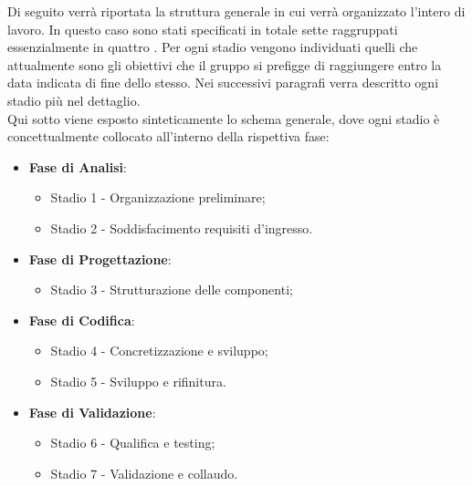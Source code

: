 Di seguito verrà riportata la struttura generale in cui verrà organizzato l'intero  di lavoro. In questo caso sono stati specificati in totale sette  raggruppati essenzialmente in quattro . Per ogni stadio vengono individuati quelli che attualmente sono gli obiettivi che il gruppo \Gruppo{} si prefigge di raggiungere entro la data indicata di fine dello stesso. Nei successivi paragrafi verra descritto ogni stadio più nel dettaglio.\\
Qui sotto viene esposto sinteticamente lo schema generale, dove ogni stadio è concettualmente collocato all'interno della rispettiva fase:

\begin{itemize}
    \item \textbf{Fase di Analisi}:
    \begin{itemize}
        \item Stadio 1 - Organizzazione preliminare;
        \item Stadio 2 - Soddisfacimento requisiti d'ingresso.
    \end{itemize}

    \item \textbf{Fase di Progettazione}:
    \begin{itemize}
        \item Stadio 3 - Strutturazione delle componenti;
    \end{itemize}

    \item \textbf{Fase di Codifica}:
    \begin{itemize}
        \item Stadio 4 - Concretizzazione e sviluppo;
        \item Stadio 5 - Sviluppo e rifinitura.
    \end{itemize}

    \item \textbf{Fase di Validazione}:
    \begin{itemize}
        \item Stadio 6 - Qualifica e testing;
        \item Stadio 7 - Validazione e collaudo.
    \end{itemize}
\end{itemize}

